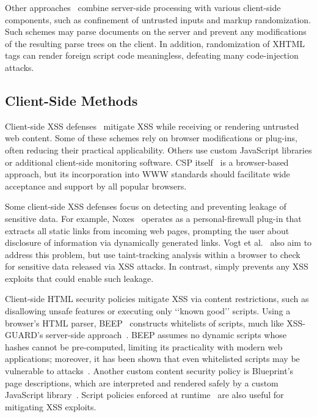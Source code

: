 Other approaches~\cite{nadji08:structure-integrity,vangundy09:noncespaces,louw09:blueprint} combine server-side processing with various client-side components, such as confinement of untrusted inputs and markup randomization. Such schemes may parse documents on the server and prevent any modifications of the resulting parse trees on the client. In addition, randomization of XHTML tags can render foreign script code meaningless, defeating many code-injection attacks. 

\subsection{Client-Side Methods}

Client-side XSS defenses~\cite{kirda06:noxes,vogt07,jim07:beep,meyerovich10:conscript,stamm10:csp,weinberger11:client} mitigate XSS while receiving or rendering untrusted web content. Some of these schemes rely on browser modifications or plug-ins, often reducing their practical applicability. Others use custom JavaScript libraries or additional client-side monitoring software. CSP itself~\cite{stamm10:csp} is a browser-based approach, but its incorporation into WWW standards should facilitate wide acceptance and support by all popular browsers.

Some client-side XSS defenses focus on detecting and preventing leakage of sensitive data. For example, Noxes~\cite{kirda06:noxes} operates as a personal-firewall plug-in that extracts all static links from incoming web pages, prompting the user about disclosure of information via dynamically generated links. Vogt et al.~\cite{vogt07} also aim to address this problem, but use taint-tracking analysis within a browser to check for sensitive data released via XSS attacks. In contrast, \dedacota simply prevents any XSS exploits that could enable such leakage.

Client-side HTML security policies mitigate XSS via content
restrictions, such as disallowing unsafe features or executing only
\lq\lq{}known good\rq\rq{} scripts. Using a browser\rq{}s HTML parser,
BEEP~\cite{jim07:beep} constructs whitelists of scripts, much like
XSS-GUARD\rq{}s server-side approach~\cite{bisht08:xssguard}. BEEP
assumes no dynamic scripts whose hashes cannot be pre-computed,
limiting its practicality with modern web applications; moreover, it
has been shown that even
whitelisted scripts may be vulnerable to
attacks~\cite{athanasopoulos09}. Another custom content security
policy is {\sc Blueprint}\rq{}s page descriptions, which are
interpreted and rendered safely by a custom JavaScript
library~\cite{louw09:blueprint}. Script policies enforced at
runtime~\cite{hallaraker05,meyerovich10:conscript} are also
useful for mitigating XSS exploits.

